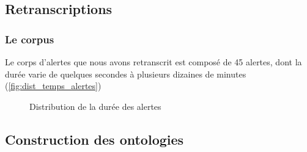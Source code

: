 
\subsection{Retranscriptions}

\subsubsection{Le corpus}

Le corps d'alertes que nous avons retranscrit est composé de 45
alertes, dont la durée varie de quelques secondes à plusieurs dizaines
de minutes (\autoref{fig:dist_temps_alertes})

\begin{figure}
  \centering
  
  \caption{Distribution de la durée des alertes}
  \label{fig:dist_temps_alertes}
\end{figure}

\subsection{Construction des ontologies}

